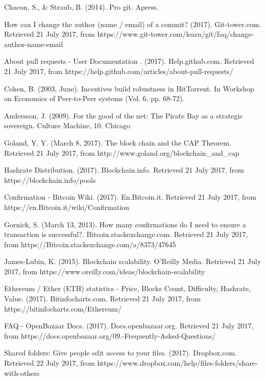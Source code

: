 \begin{thebibliography}{99}
Chacon, S., \& Straub, B. (2014). Pro git. Apress.

How can I change the author (name / email) of a commit? (2017). Git-tower.com. Retrieved 21 July 2017, from https://www.git-tower.com/learn/git/faq/change-author-name-email

About pull requests - User Documentation . (2017). Help.github.com. Retrieved 21 July 2017, from https://help.github.com/articles/about-pull-requests/

Cohen, B. (2003, June). Incentives build robustness in BitTorrent. In Workshop on Economics of Peer-to-Peer systems (Vol. 6, pp. 68-72).

Andersson, J. (2009). For the good of the net: The Pirate Bay as a strategic sovereign. Culture Machine, 10.
Chicago 

Goland, Y. Y. (March 8, 2017). The block chain and the CAP Theorem. Retrieved 21 July 2017, from http://www.goland.org/blockchain\_and\_cap

Hashrate Distribution. (2017). Blockchain.info. Retrieved 21 July 2017, from https://blockchain.info/pools

Confirmation - Bitcoin Wiki. (2017). En.Bitcoin.it. Retrieved 21 July 2017, from https://en.Bitcoin.it/wiki/Confirmation

Gornick, S. (March 13, 2013). How many confirmations do I need to ensure a transaction is successful?. Bitcoin.stackexchange.com. Retrieved 21 July 2017, from https://Bitcoin.stackexchange.com/a/8373/47645

James-Lubin, K. (2015). Blockchain scalability. O'Reilly Media. Retrieved 21 July 2017, from https://www.oreilly.com/ideas/blockchain-scalability

Ethereum / Ether (ETH) statistics - Price, Blocks Count, Difficulty, Hashrate, Value. (2017). Bitinfocharts.com. Retrieved 21 July 2017, from https://bitinfocharts.com/Ethereum/

FAQ - OpenBazaar Docs. (2017). Docs.openbazaar.org. Retrieved 21 July 2017, from https://docs.openbazaar.org/09.-Frequently-Asked-Questions/

Shared folders: Give people edit access to your files. (2017). Dropbox.com. Retrieved 22 July 2017, from https://www.dropbox.com/help/files-folders/share-with-others


\end{thebibliography}
